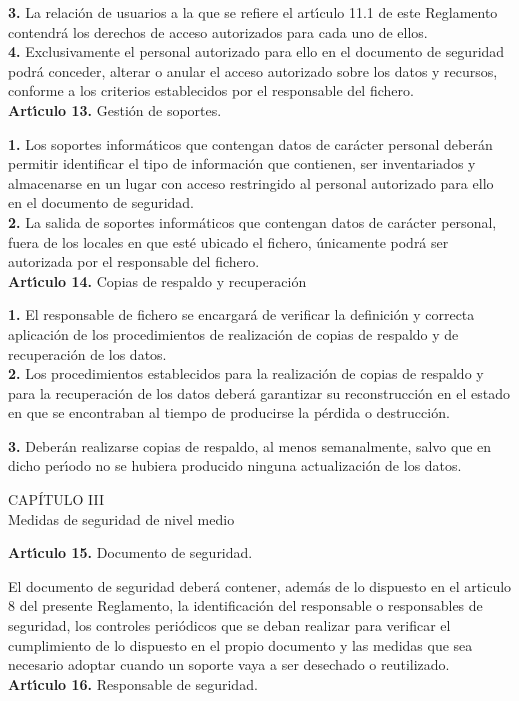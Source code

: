 {\bf 3.} La relaci\'on de usuarios a la que se refiere el art\'{\i}culo 11.1 de 
este Reglamento contendr\'a los derechos de acceso autorizados para cada uno de 
ellos.\\

{\bf 4.} Exclusivamente el personal autorizado para ello en el documento de 
seguridad podr\'a conceder, alterar o anular el acceso autorizado sobre los 
datos y recursos, conforme a los criterios establecidos por el responsable del 
fichero.
\vspace{0.3cm}\\
{\large {\bf Art\'{\i}culo 13.} Gesti\'on de soportes.}

{\bf 1.} Los soportes inform\'aticos que contengan datos de car\'acter personal 
deber\'an permitir identificar el tipo de informaci\'on que contienen, ser 
inventariados y almacenarse en un lugar con acceso restringido al personal 
autorizado para ello en el documento de seguridad.\\

{\bf 2.} La salida de soportes inform\'aticos que contengan datos de car\'acter 
personal, fuera de los locales en que est\'e ubicado el fichero, \'unicamente 
podr\'a ser autorizada por el responsable del fichero.
\vspace{0.3cm}\\
{\large {\bf Art\'{\i}culo 14.} Copias de respaldo y recuperaci\'on}

{\bf 1.} El responsable de fichero se encargar\'a de verificar la definici\'on 
y correcta aplicaci\'on de los procedimientos de realizaci\'on de copias de 
respaldo y de recuperaci\'on de los datos.\\

{\bf 2.} Los procedimientos establecidos para la realizaci\'on de copias de 
respaldo y para la recuperaci\'on de los datos deber\'a garantizar su 
reconstrucci\'on en el estado en que se encontraban al tiempo de producirse la 
p\'erdida o destrucci\'on.

{\bf 3.} Deber\'an realizarse copias de respaldo, al menos semanalmente, salvo 
que en dicho per\'{\i}odo no se hubiera producido ninguna actualizaci\'on de 
los datos.
\begin{center}
{\LARGE CAP\'ITULO III}\\ {\large Medidas de seguridad de nivel medio}
\end{center}
\vspace{0.3cm}
{\large {\bf Art\'{\i}culo 15.} Documento de seguridad.}

El documento de seguridad deber\'a contener, adem\'as de lo dispuesto en el 
articulo 8 del presente Reglamento, la identificaci\'on del responsable o 
responsables de seguridad, los controles peri\'odicos que se deban realizar 
para verificar el cumplimiento de lo dispuesto en el propio documento y las 
medidas que sea necesario adoptar cuando un soporte vaya a ser desechado o 
reutilizado.
\vspace{0.3cm}\\
{\large {\bf Art\'{\i}culo 16.} Responsable de seguridad.}

